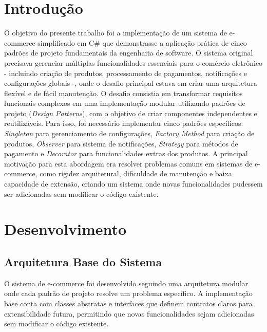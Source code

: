 \documentclass[
	12pt,				%
	oneside,			%
	a4paper,			%
	english,			%
	brazil,				%
	]{abntex2}
\begin{document}
\frenchspacing 

\imprimircapa

{
\ABNTEXchapterfont

\textual

\section{Introdução}
O objetivo do presente trabalho foi a implementação de um sistema de e-commerce simplificado em C# que demonstrasse a aplicação prática de cinco padrões de projeto fundamentais da engenharia de software. O sistema original precisava gerenciar múltiplas funcionalidades essenciais para o comércio eletrônico - incluindo criação de produtos, processamento de pagamentos, notificações e configurações globais -, onde o desafio principal estava em criar uma arquitetura flexível e de fácil manutenção.
O desafio consistia em transformar requisitos funcionais complexos em uma implementação modular utilizando padrões de projeto (\textit{Design Patterns}), com o objetivo de criar componentes independentes e reutilizáveis. Para isso, foi necessário implementar cinco padrões específicos: \textit{Singleton} para gerenciamento de configurações, \textit{Factory Method} para criação de produtos, \textit{Observer} para sistema de notificações, \textit{Strategy} para métodos de pagamento e \textit{Decorator} para funcionalidades extras dos produtos.
A principal motivação para esta abordagem era resolver problemas comuns em sistemas de e-commerce, como rigidez arquitetural, dificuldade de manutenção e baixa capacidade de extensão, criando um sistema onde novas funcionalidades pudessem ser adicionadas sem modificar o código existente.
\section{Desenvolvimento}
\subsection{Arquitetura Base do Sistema}
O sistema de e-commerce foi desenvolvido seguindo uma arquitetura modular onde cada padrão de projeto resolve um problema específico. A implementação base conta com classes abstratas e interfaces que definem contratos claros para extensibilidade futura, permitindo que novas funcionalidades sejam adicionadas sem modificar o código existente.
}
\end{document}
